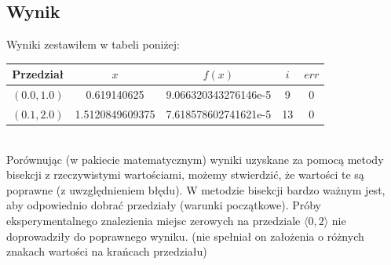 \subsection{Wynik}
Wyniki zestawiłem w tabeli poniżej: \\
\begin{center}
\begin{tabular}{|c|c|c|c|c|}
  \hline 
    Przedział & $x$ & $ f(x)$ & $i$ & $err$ \\
  \hline
  $ (0.0, 1.0) $ & 0.619140625 & 9.066320343276146e-5 & 9 & 0\\
  \hline 
  $ (0.1, 2.0) $ & 1.5120849609375 & 7.618578602741621e-5 & 13 & 0\\
  \hline
\end{tabular} 
\end{center}

\ \\
Porównując (w pakiecie matematycznym) wyniki uzyskane za pomocą metody bisekcji z rzeczywistymi wartościami, możemy stwierdzić, że wartości te są poprawne (z uwzględnieniem błędu). W metodzie bisekcji bardzo ważnym jest, aby odpowiednio dobrać przedziały (warunki początkowe). Próby eksperymentalnego znalezienia miejsc zerowych na przedziale $ \langle0, 2\rangle $ nie doprowadziły do poprawnego wyniku. (nie spełniał on założenia o różnych znakach wartości na krańcach przedziału)